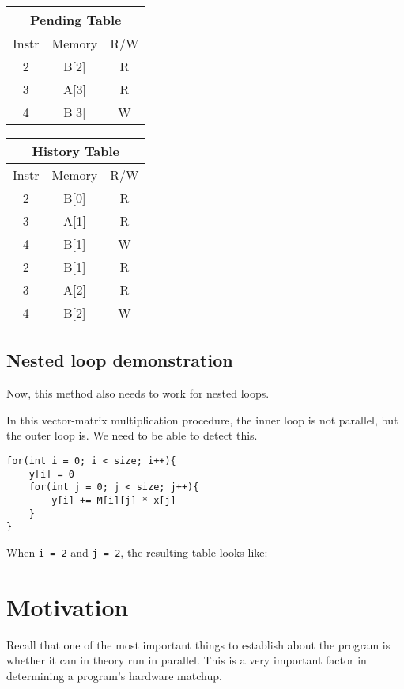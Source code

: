 \documentclass[12pt,twoside]{reedthesis}
\begin{document}
		\begin{tabular}{ |c|c|c| } 
			\hline
			\multicolumn{3}{|c|}{Pending Table} \\
			\hline
			Instr & Memory & R/W \\ 
			\hline
			2 & B[2] & R \\ 
			3 & A[3] & R \\ 
			4 & B[3] & W \\ 
			\hline
		\end{tabular}
		\begin{tabular}{ |c|c|c| } 
			\hline
			\multicolumn{3}{|c|}{History Table} \\
			\hline
			Instr & Memory & R/W \\ 
			\hline
			2 & B[0] & R \\ 
			3 & A[1] & R \\ 
			4 & B[1] & W \\ 
			2 & B[1] & R \\ 
			3 & A[2] & R \\ 
			4 & B[2] & W \\ 
			\hline
		\end{tabular}
				
		\subsection{Nested loop demonstration}
		
		Now, this method also needs to work for nested loops.  
		
		In this vector-matrix multiplication procedure, the inner loop is not parallel, but the outer loop is. We need to be able to detect this.
		
		
		\begin{lstlisting}
for(int i = 0; i < size; i++){
	y[i] = 0
	for(int j = 0; j < size; j++){
		y[i] += M[i][j] * x[j]
	}
}
		\end{lstlisting}
		
		When \texttt{i = 2} and \texttt{j = 2}, the resulting table looks like:
		
		
	
	\section{Motivation}
	
		Recall that one of the most important things to establish about the program is whether it can in theory run in parallel. This is a very important factor in determining a program's hardware matchup.
\end{document}
